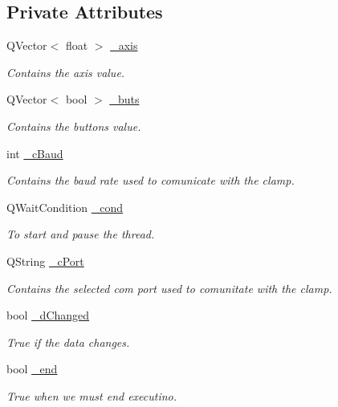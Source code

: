 \subsection*{Private Attributes}
\begin{DoxyCompactItemize}
\item 
Q\+Vector$<$ float $>$ \hyperlink{class_servo_thread_aad24ef961ee39dd35766c725c13b11b7}{\+\_\+axis}
\begin{DoxyCompactList}\small\item\em Contains the axis value. \end{DoxyCompactList}\item 
Q\+Vector$<$ bool $>$ \hyperlink{class_servo_thread_a6f956f7e0f2953e213ff95fb64857ab0}{\+\_\+buts}
\begin{DoxyCompactList}\small\item\em Contains the buttons value. \end{DoxyCompactList}\item 
int \hyperlink{class_servo_thread_a9fccfd415e2e55c8abef7fcc6535af30}{\+\_\+c\+Baud}
\begin{DoxyCompactList}\small\item\em Contains the baud rate used to comunicate with the clamp. \end{DoxyCompactList}\item 
Q\+Wait\+Condition \hyperlink{class_servo_thread_afcb93c09acd7fecf47d92996a297365c}{\+\_\+cond}
\begin{DoxyCompactList}\small\item\em To start and pause the thread. \end{DoxyCompactList}\item 
Q\+String \hyperlink{class_servo_thread_ab52437b31a433c427a6c050f2b1cc959}{\+\_\+c\+Port}
\begin{DoxyCompactList}\small\item\em Contains the selected com port used to comunitate with the clamp. \end{DoxyCompactList}\item 
bool \hyperlink{class_servo_thread_a2b6ccfeacbb3cc9ac5c34549b9aa3f11}{\+\_\+d\+Changed}
\begin{DoxyCompactList}\small\item\em True if the data changes. \end{DoxyCompactList}\item 
bool \hyperlink{class_servo_thread_acca9896d1a2d1ef68527e6834f81c76c}{\+\_\+end}
\begin{DoxyCompactList}\small\item\em True when we must end executino. \end{DoxyCompactList}\item 

\end{DoxyCompactItemize}

